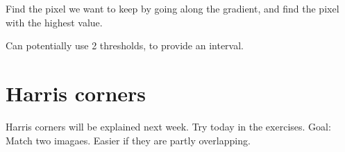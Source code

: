 \documentclass{article}
\begin{document}
Find the pixel we want to keep by going along the gradient, and find the pixel with the highest value. 

Can potentially use 2 thresholds, to provide an interval.

\section{Harris corners}
Harris corners will be explained next week. Try today in the exercises.
Goal: Match two imagaes. Easier if they are partly overlapping.
\end{document}
